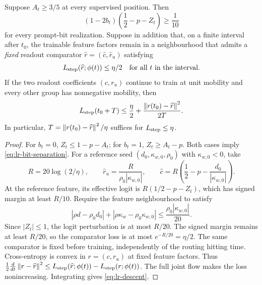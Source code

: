\begin{lrlemma}
\label{lem:lr-readout-convergence}
Suppose $A_t\ge3/5$ at every supervised position.  Then
\begin{equation}\label{eq:lr-bit-separation}
 (1-2b_t)\left(\frac12-p-Z_t\right)\ge\frac1{10}
\end{equation}
for every prompt-bit realization.  Suppose in addition that, on a
finite interval after $t_0$, the trainable feature factors remain in a
neighbourhood that admits a \emph{fixed} readout comparator
$\widehat r=(\widehat c,\widehat r_u)$ satisfying
\begin{equation}\label{eq:lr-comparator}
 L_{\mathrm{step}}(\widehat r;\phi(t))\le\eta/2
 \quad\text{for all }t\text{ in the interval}.
\end{equation}
If the two readout coefficients $(c,r_u)$ continue to train at unit
mobility and every other group has nonnegative mobility, then
\begin{equation}\label{eq:lr-descent}
 L_{\mathrm{step}}(t_0+T)\le\frac\eta2+
 \frac{\left\lVert r(t_0)-\widehat r\right\rVert^2}{2T}.
\end{equation}
In particular, $T=\left\lVert r(t_0)-\widehat r\right\rVert^2/\eta$ suffices for
$L_{\mathrm{step}}\le\eta$.
\end{lrlemma}
\begin{proof}
For $b_t=0$, $Z_t\le1-p-A_t$; for $b_t=1$,
$Z_t\ge A_t-p$.  Both cases imply
\eqref{eq:lr-bit-separation}.
For a reference seed $(d_0,\kappa_{w,0},\rho_0)$ with $\kappa_{w,0}<0$, take
\[
 R=20\log(2/\eta),\qquad
 \widehat r_u=\frac{R}{\rho_0|\kappa_{w,0}|},\qquad
 \widehat c=R\left(\frac12-p-\frac{d_0}{|\kappa_{w,0}|}\right).
\]
At the reference feature, its effective logit is
$R(1/2-p-Z_t)$, which has signed margin at least $R/10$.
Require the feature neighbourhood to satisfy
\begin{equation}\label{eq:lr-comparator-stability}
 |\rho d-\rho_0d_0|+|\rho \kappa_w-\rho_0\kappa_{w,0}|
 \le\frac{\rho_0|\kappa_{w,0}|}{20}.
\end{equation}
Since $|Z_t|\le1$, the logit perturbation is at most $R/20$.
The signed margin remains at least $R/20$, so the comparator loss is
at most $e^{-R/20}=\eta/2$. The same comparator is fixed before training,
independently of the routing hitting time.
Cross-entropy is convex in $r=(c,r_u)$ at fixed feature factors.  Thus
$\frac12\frac{d}{dt}\left\lVert r-\widehat r\right\rVert^2
\le L_{\mathrm{step}}(\widehat r;\phi(t))-L_{\mathrm{step}}(r;\phi(t))$.
The full joint flow makes the loss nonincreasing.  Integrating gives
\eqref{eq:lr-descent}.
\end{proof}


